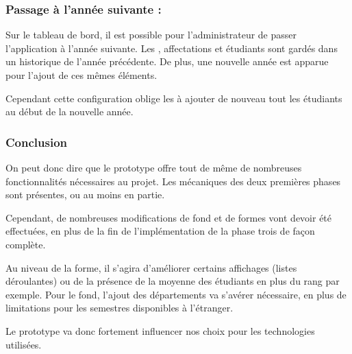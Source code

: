 \subsubsection{Passage à l'année suivante :}
Sur le tableau de bord, il est possible pour l'administrateur de passer l'application à l'année suivante. Les \voe, affectations et étudiants sont gardés dans un historique de l'année précédente. De plus, une nouvelle année est apparue pour l'ajout de ces mêmes éléments.

Cependant cette configuration oblige les \ris à ajouter de nouveau tout les étudiants au début de la nouvelle année.


\subsubsection{Conclusion}
On peut donc dire que le prototype offre tout de même de nombreuses fonctionnalités nécessaires au projet. Les mécaniques des deux premières phases sont présentes, ou au moins en partie. 

Cependant, de nombreuses modifications de fond et de formes vont devoir été effectuées, en plus de la fin de l'implémentation de la phase trois de façon complète.

Au niveau de la forme, il s'agira d'améliorer certains affichages (listes déroulantes) ou de la présence de la moyenne des étudiants en plus du rang par exemple. Pour le fond, l'ajout des départements va s'avérer nécessaire, en plus de limitations pour les semestres disponibles à l'étranger.

Le prototype va donc fortement influencer nos choix pour les technologies utilisées.

